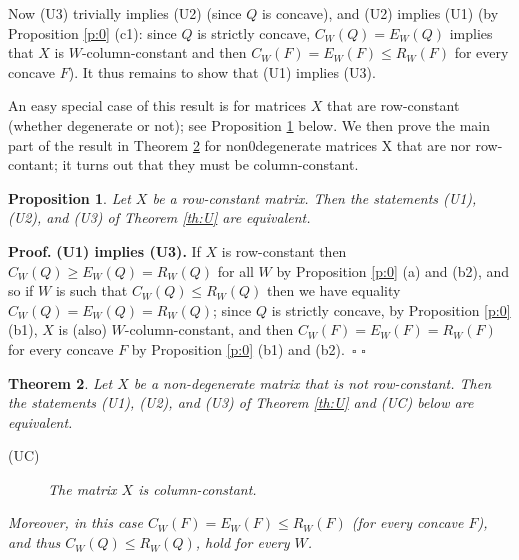 \documentclass[12pt,a4paper,notitlepage]{article}
\newtheorem{theorem}{Theorem}
\newtheorem{proposition}[theorem]{Proposition}
\newenvironment{proof}[1][Proof]{\noindent\textbf{#1.} }{\hfill $\square$}
\begin{document}
Now (U3) trivially implies (U2) (since $Q$ is concave), and (U2) implies
(U1) (by Proposition \ref{p:0} (c1): since $Q$ is strictly concave, $%
C_{W}(Q)=E_{W}(Q)$ implies that $X$ is $W$-column-constant and then $%
C_{W}(F)=E_{W}(F)\leq R_{W}(F)$ for every concave $F$). It thus remains to
show that (U1) implies (U3).

An easy special case of this result is for matrices $X$ that are
row-constant (whether degenerate or not); see Proposition \ref{p:row} below.
We then prove the main part of the result in Theorem \ref{th:column} for
non0degenerate matrices X that are nor row-contant; it turns out that they
must be column-constant.

\begin{proposition}
\label{p:row}Let $X$ be a row-constant matrix. Then the statements (U1),
(U2), and (U3) of Theorem \ref{th:U} are equivalent.
\end{proposition}

\begin{proof}
\textbf{(U1) implies (U3).} If $X$ is row-constant then $C_{W}(Q)\geq
E_{W}(Q)=R_{W}(Q)$ for all $W$ by Proposition \ref{p:0} (a) and (b2), and so
if $W$ is such that $C_{W}(Q)\leq R_{W}(Q)$ then we have equality $%
C_{W}(Q)=E_{W}(Q)=R_{W}(Q)$; since $Q$ is strictly concave, by Proposition %
\ref{p:0} (b1), $X$ is (also) $W$-column-constant, and then $%
C_{W}(F)=E_{W}(F)=R_{W}(F)$ for every concave $F$ by Proposition \ref{p:0}
(b1) and (b2).~$\square $
\end{proof}

\begin{theorem}
\label{th:column}Let $X$ be a non-degenerate matrix that is not
row-constant. Then the statements (U1), (U2), and (U3) of Theorem \ref{th:U}
and (UC) below are equivalent.

\begin{description}
\item[(UC)] The matrix $X$ is column-constant.
\end{description}

\noindent Moreover, in this case $C_{W}(F)=E_{W}(F)\leq R_{W}(F)$ (for every
concave $F$), and thus $C_{W}(Q)\leq R_{W}(Q)$, hold for every $W$.
\end{theorem}
\end{document}
